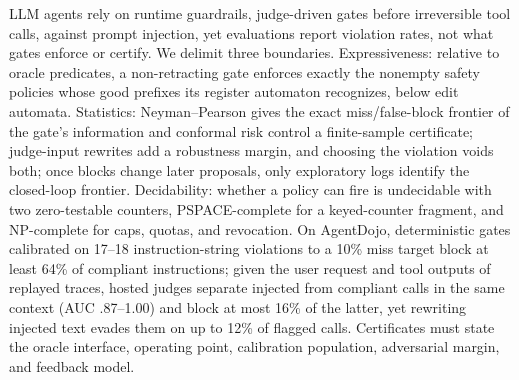 LLM agents rely on runtime guardrails, judge-driven gates before irreversible tool calls, against
prompt injection, yet evaluations report violation rates, not what gates enforce or certify. We
delimit three boundaries. Expressiveness: relative to oracle predicates, a non-retracting gate enforces
exactly the nonempty safety policies whose good prefixes its register automaton recognizes, below edit automata.
Statistics: Neyman--Pearson gives the exact miss/false-block frontier of the gate's information and
conformal risk control a finite-sample certificate; judge-input rewrites add a robustness margin, and
choosing the violation voids both; once blocks change later proposals, only exploratory logs identify the
closed-loop frontier. Decidability: whether a policy can fire is undecidable with two zero-testable
counters, PSPACE-complete for a keyed-counter fragment, and NP-complete for caps, quotas, and
revocation. On AgentDojo, deterministic gates calibrated on 17--18 instruction-string violations to a
10\% miss target block at least 64\% of compliant instructions; given the user request and tool outputs
of replayed traces, hosted judges separate injected from compliant calls in the same context (AUC
.87--1.00) and block at most 16\% of the latter, yet rewriting injected text evades them on up to
12\% of flagged calls. Certificates must state the oracle interface, operating point, calibration
population, adversarial margin, and feedback model.
